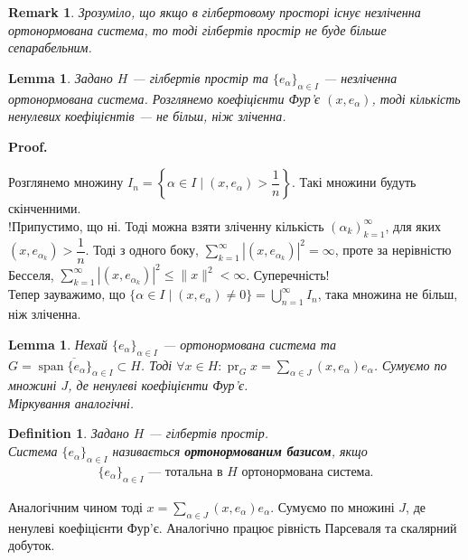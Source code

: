 \documentclass[a4paper, 10pt]{article}
\makeatletter
\theoremstyle{theoremdd}
\theoremstyle{theoremdd}
\newtheorem{definition}[theorem]{Definition}
\theoremstyle{theoremdd}
\theoremstyle{theoremdd}
\theoremstyle{theoremdd}
\theoremstyle{theoremdd}
\newtheorem{remark}[theorem]{Remark}
\theoremstyle{theoremdd}
\newtheorem{lemma}[theorem]{Lemma}
\theoremstyle{theoremdd}
\DeclareMathOperator{\pr}{pr}
\renewenvironment{proof}[1][Proof.\\]{\par
\pushQED{\hfill \qed}%
\normalfont \topsep6\p@\@plus6\p@\relax
\trivlist
\item\relax
{\bfseries
#1\@addpunct{.}}\hspace\labelsep\ignorespaces
}{%
\popQED\endtrivlist\@endpefalse
}
\DeclareMathOperator{\linspan}{span}
\makeatother
\begin{document}
\begin{remark}
Зрозуміло, що якщо в гілбертовому просторі існує незліченна ортонормована система, то тоді гілбертів простір не буде більше сепарабельним.
\end{remark}

\begin{lemma}
Задано $H$ --- гілбертів простір та $\{e_\alpha\}_{\alpha \in I}$ --- незліченна ортонормована система. Розглянемо коефіцієнти Фур'є $(x,e_\alpha)$, тоді кількість ненулевих коефіцієнтів --- не більш, ніж зліченна.
\end{lemma}

\begin{proof}
Розглянемо множину $I_n = \left\{ \alpha \in I \mid (x,e_\alpha) > \dfrac{1}{n} \right\}$. Такі множини будуть скінченними.\\
!Припустимо, що ні. Тоді можна взяти зліченну кількість $(\alpha_k)_{k=1}^\infty$, для яких $(x,e_{\alpha_k}) > \dfrac{1}{n}$. Тоді з одного боку, $\displaystyle\sum_{k=1}^\infty |(x,e_{\alpha_k})|^2 = \infty$, проте за нерівністю Бесселя, $\displaystyle\sum_{k=1}^\infty |(x,e_{\alpha_k})|^2 \leq \|x\|^2 < \infty$. Суперечність!\\
Тепер зауважимо, що $\{\alpha \in I \mid (x,e_\alpha) \neq 0\} = \displaystyle\bigcup_{n=1}^\infty I_n$, така множина не більш, ніж зліченна.
\end{proof}

\begin{lemma}
Нехай $\{e_\alpha\}_{\alpha \in I}$ --- ортонормована система та $G = \overline{\linspan\{e_\alpha\}_{\alpha \in I}} \subset H$. Тоді $\forall x \in H: \pr_G x = \displaystyle\sum_{\alpha \in J}(x,e_\alpha) e_\alpha$. Сумуємо по множині $J$, де ненулеві коефіцієнти Фур'є.\\
\textit{Міркування аналогічні.}
\end{lemma}

\begin{definition}
Задано $H$ --- гілбертів простір.\\
Система $\{e_\alpha\}_{\alpha \in I}$ називається \textbf{ортонормованим базисом}, якщо
\begin{align*}
\{e_\alpha\}_{\alpha \in I} \text{ --- тотальна в $H$ ортонормована система}.
\end{align*}
\end{definition}
Аналогічним чином тоді $x = \displaystyle\sum_{\alpha \in J} (x,e_\alpha) e_\alpha$. Сумуємо по множині $J$, де ненулеві коефіцієнти Фур'є. Аналогічно працює рівність Парсеваля та скалярний добуток.
\end{document}
